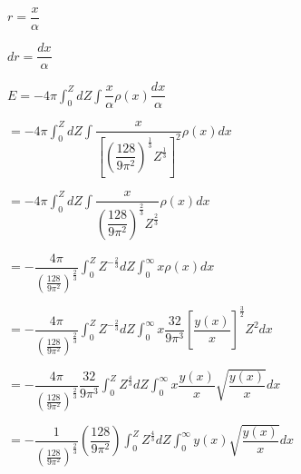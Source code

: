 \documentclass{jarticle}%
\begin{document}
$r=\dfrac{x}{\alpha}$

$dr=\dfrac{dx}{\alpha}$

$E=-4\pi%
{\displaystyle\int\nolimits_{0}^{Z}}
dZ%
{\displaystyle\int}
\dfrac{x}{\alpha}\rho\left(  x\right)  \dfrac{dx}{\alpha}$

$=-4\pi%
{\displaystyle\int\nolimits_{0}^{Z}}
dZ%
{\displaystyle\int}
\dfrac{x}{\left[  \left(  \dfrac{128}{9\pi^{2}}\right)  ^{\frac{1}{3}}%
Z^{\frac{1}{3}}\right]  ^{2}}\rho\left(  x\right)  dx$

$=-4\pi%
{\displaystyle\int\nolimits_{0}^{Z}}
dZ%
{\displaystyle\int}
\dfrac{x}{\left(  \dfrac{128}{9\pi^{2}}\right)  ^{\frac{2}{3}}Z^{\frac{2}{3}}%
}\rho\left(  x\right)  dx$

$=-\dfrac{4\pi}{\left(  \tfrac{128}{9\pi^{2}}\right)  ^{\frac{2}{3}}}%
{\displaystyle\int\nolimits_{0}^{Z}}
Z^{-\frac{2}{3}}dZ%
{\displaystyle\int_{0}^{\infty}}
x\rho\left(  x\right)  dx$

$=-\dfrac{4\pi}{\left(  \tfrac{128}{9\pi^{2}}\right)  ^{\frac{2}{3}}}%
{\displaystyle\int\nolimits_{0}^{Z}}
Z^{-\frac{2}{3}}dZ%
{\displaystyle\int_{0}^{\infty}}
x\dfrac{32}{9\pi^{3}}\left[  \dfrac{y\left(  x\right)  }{x}\right]  ^{\frac
{3}{2}}Z^{2}dx$

$=-\dfrac{4\pi}{\left(  \tfrac{128}{9\pi^{2}}\right)  ^{\frac{2}{3}}}%
\dfrac{32}{9\pi^{3}}%
{\displaystyle\int\nolimits_{0}^{Z}}
Z^{\frac{4}{3}}dZ%
{\displaystyle\int_{0}^{\infty}}
x\dfrac{y\left(  x\right)  }{x}\sqrt{\dfrac{y\left(  x\right)  }{x}}dx$

$=-\dfrac{1}{\left(  \tfrac{128}{9\pi^{2}}\right)  ^{\frac{2}{3}}}\left(
\dfrac{128}{9\pi^{2}}\right)
{\displaystyle\int\nolimits_{0}^{Z}}
Z^{\frac{4}{3}}dZ%
{\displaystyle\int_{0}^{\infty}}
y\left(  x\right)  \sqrt{\dfrac{y\left(  x\right)  }{x}}dx$
\end{document}
